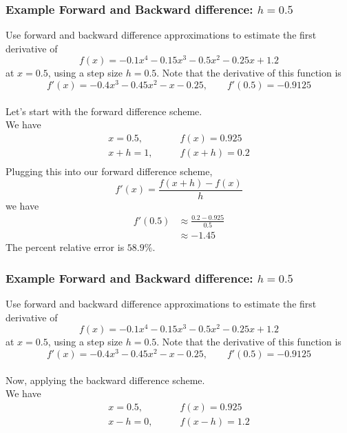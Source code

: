\documentclass{if-beamer}
\begin{document}
\begin{frame}
	\frametitle{Example Forward and Backward difference: $h= 0.5$}
	Use forward and backward difference approximations to estimate the first derivative of
	$$f(x) = -0.1x^4-0.15x^3-0.5x^2-0.25x+1.2 $$
	at $x=0.5$, using a step size $h = 0.5$. Note that the derivative of this function is
	$$f'(x) = -0.4x^3-0.45x^2-x-0.25, \qquad f'(0.5) = -0.9125$$
	\\\vspace{5pt}
	Let's start with the forward difference scheme.\\\vspace{5pt}
	We have
	\begin{align*}
		x = 0.5, \qquad &f(x) = 0.925\\
		x+h = 1, \qquad &f(x+h) = 0.2\\
	\end{align*}
	Plugging this into our forward difference scheme, 
	$$f'(x) = \frac{f(x+h)-f(x)}{h} $$
	we have
	\begin{align*}
		f'(0.5) &\approx \frac{0.2-0.925}{0.5} \\
		&\approx -1.45
	\end{align*}
	The percent relative error is $58.9\%$.
\end{frame}


\begin{frame}
	\frametitle{Example Forward and Backward difference: $h= 0.5$}
	Use forward and backward difference approximations to estimate the first derivative of
	$$f(x) = -0.1x^4-0.15x^3-0.5x^2-0.25x+1.2 $$
	at $x=0.5$, using a step size $h = 0.5$. Note that the derivative of this function is
	$$f'(x) = -0.4x^3-0.45x^2-x-0.25, \qquad f'(0.5) = -0.9125$$
	\\\vspace{5pt}
	Now, applying the backward difference scheme.\\\vspace{5pt}
	We have
	\begin{align*}
		x = 0.5, \qquad &f(x) = 0.925\\
		x-h = 0, \qquad &f(x-h) = 1.2\\
	\end{align*}
\end{frame}
\end{document}
